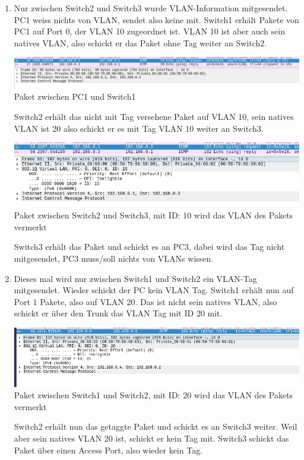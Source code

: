 \documentclass{article}
\begin{document}
\begin{enumerate}
    \item Nur zwischen Switch2 und Switch3 wurde VLAN-Information mitgesendet. PC1 weiss nichts von VLAN, sendet also keine mit. Switch1 erhält Pakete von PC1 auf Port 0, der VLAN 10 zugeordnet ist. VLAN 10 ist aber auch sein natives VLAN, also schickt er das Paket ohne Tag weiter an Switch2.
    
    \begin{center}
        \includegraphics[width=.9\textwidth]{pc1-pc3-noflag.png}
        Paket zwischen PC1 und Switch1    
    \end{center}

    Switch2 erhält das nicht mit Tag versehene Paket auf VLAN 10, sein natives VLAN ist 20 also schickt er es mit Tag VLAN 10 weiter an Switch3.

    \begin{center}
        \includegraphics[width=.9\textwidth]{pc1-pc3-flag.png}
        Paket zwischen Switch2 und Switch3, mit ID: 10 wird das VLAN des Pakets vermerkt 
    \end{center}

    Switch3 erhält das Paket und schickt es an PC3, dabei wird das Tag nicht mitgesendet, PC3 muss/soll nichts von VLANs wissen.

    \item Dieses mal wird nur zwischen Switch1 und Switch2 ein VLAN-Tag mitgesendet. Wieder schickt der PC kein VLAN Tag. Switch1 erhält nun auf Port 1 Pakete, also auf VLAN 20. Das ist nicht sein natives VLAN, also schickt er über den Trunk das VLAN Tag mit ID 20 mit.

    \begin{center}
        \includegraphics[width=.9\textwidth]{pc2-pc4-flag.png}
        Paket zwischen Switch1 und Switch2, mit ID: 20 wird das VLAN des Pakets vermerkt 
    \end{center}

    Switch2 erhält nun das getaggte Paket und schickt es an Switch3 weiter. Weil aber sein natives VLAN 20 ist, schickt er kein Tag mit. Switch3 schickt das Paket über einen Access Port, also wieder kein Tag.
\end{enumerate}
\end{document}

